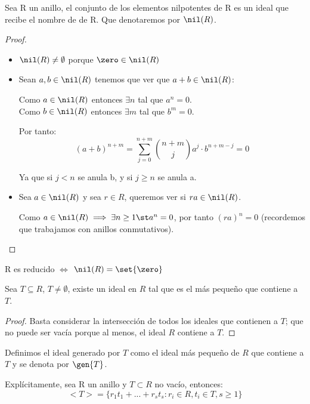 \begin{lemma}
 Sea R un anillo, el conjunto de los elementos nilpotentes de R es un ideal que recibe el nombre de  de R. Que denotaremos por $\nil(R)$.
\end{lemma}
\begin{proof}
	\begin{itemize}
		\item $\nil(R) \neq \emptyset$ porque $\zero \in \nil(R)$
		\item Sean $a,b \in \nil(R)$ tenemos que ver que $a+b \in \nil(R)$:

		Como $a \in \nil(R)$ entonces $\exists n$ tal que $a^n=0$.\\
		Como $b \in \nil(R)$ entonces $\exists m$ tal que $b^m=0$.

		Por tanto:
		$$(a+b)^{n+m} = \sum_{j=0}^{n+m} \binom{n+m}{j} a^j \cdot b^{n+m-j} = 0$$

		Ya que si $j<n$ se anula b, y si $j \geq n$ se anula a.
		\item Sea $a \in \nil(R)$ y sea $r\in R$, queremos ver si $ra \in \nil(R)$.

		Como $a\in \nil(R) \implies \exists n \geq 1 \st a^n=0$, por tanto $(ra)^n = 0$ (recordemos que trabajamos con anillos conmutativos).
	\end{itemize}
\end{proof}

\begin{prop}
	R es reducido $\Leftrightarrow$ $\nil(R)=\set{\zero}$
\end{prop}


\begin{prop}
	Sea $T \subseteq R$, $T \neq \emptyset$, existe un ideal en $R$ tal que es el más pequeño que contiene a $T$.
\end{prop}
\begin{proof}
	Basta considerar la intersección de todos los ideales que contienen a $T$; que no puede ser vacía porque al menos, el ideal $R$ contiene a $T$.
\end{proof}

\begin{defn}
Definimos el ideal generado por $T$ como el ideal más pequeño de $R$ que contiene a $T$ y se denota por $\gen{T}$.

Explícitamente, sea R un anillo y $T \subset R$ no vacío, entonces:
$$ <T> = \{r_1t_1+...+r_st_s: r_i \in R, t_i \in T, s \geq 1 \} $$
\end{defn}


